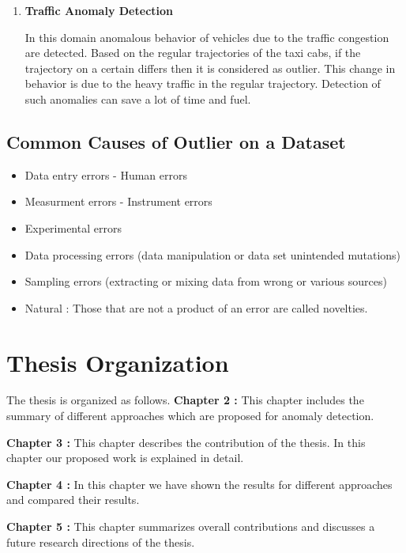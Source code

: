 \begin{enumerate}
\item \textbf{Traffic Anomaly Detection}\

In this  domain 
anomalous behavior of vehicles due to the traffic congestion are detected. Based on the regular trajectories of the taxi cabs, if the trajectory on a certain differs then it is considered as outlier. This change in behavior is due to the heavy traffic in the regular trajectory. Detection of such anomalies can save a lot of time and fuel.   

\end{enumerate}


\subsection{Common Causes of Outlier on a Dataset}





\begin{itemize}
	\item Data entry errors - Human errors
	\item Measurment errors - Instrument errors
	\item Experimental errors
	\item Data processing errors (data manipulation or data set unintended mutations)
	\item Sampling errors (extracting or mixing data from wrong or various sources)
	
	\item Natural :  Those that are not a product of an error are called novelties.
	
\end{itemize} 

 
	
	




\section{Thesis Organization}

The thesis is organized as follows.
\textbf{Chapter 2 :} This chapter includes the summary of different approaches which are proposed for anomaly detection.

\textbf{Chapter 3 :} This chapter describes the contribution of the thesis. In this chapter our proposed work is explained in detail. 


\textbf{Chapter 4 :} In this chapter we have shown the results for different approaches and compared their results.


\textbf{Chapter 5 :} This chapter summarizes overall contributions and discusses a future research
directions of the thesis.

 


	




